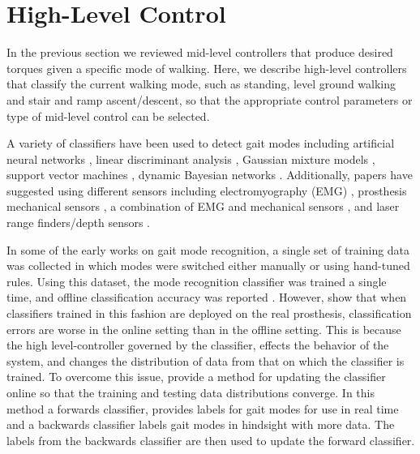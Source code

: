 \section{High-Level Control}\label{sec:back_high_level_control}

In the previous section we reviewed mid-level controllers that produce desired
torques given a specific mode of walking. Here, we describe high-level
controllers that classify the current walking mode, such as standing, level
ground walking and stair and ramp ascent/descent, so that the appropriate
control parameters or type of mid-level control can be selected. 

A variety of classifiers have been used to detect gait modes including
artificial neural networks \citep{huang2009strategy}, linear discriminant
analysis
\citep{huang2009strategy,huang2011continuous,hargrove2015intuitive,young2014intent},
Gaussian mixture models \citep{varol2010multiclass}, support vector machines
\citep{huang2011continuous,massalin2017user,yan2018locomotion}, dynamic Bayesian
networks \citep{young2014intent,hargrove2015intuitive,spanias2018online}.
Additionally, papers have suggested using different sensors including
electromyography (EMG) \citep{huang2009strategy}, prosthesis mechanical sensors
\citep{varol2010multiclass,young2014intent,young2014training}, a combination of
EMG and mechanical sensors
\citep{huang2011continuous,spanias2018online,hargrove2015intuitive}, and laser
range finders/depth sensors
\citep{zhang2011preliminary,liu2016development,massalin2017user,yan2018locomotion}.

In some of the early works on gait mode recognition, a single set of training
data was collected in which modes were switched either manually or using
hand-tuned rules. Using this dataset, the mode recognition classifier was
trained a single time, and offline classification accuracy was reported
\citep{huang2009strategy,huang2011continuous,young2014intent}. However,
\citet{hargrove2015intuitive} show that when classifiers trained in this fashion
are deployed on the real prosthesis, classification errors are worse in the
online setting than in the offline setting. This is because the high
level-controller governed by the classifier, effects the behavior of the system,
and changes the distribution of data from that on which the classifier is
trained. To overcome this issue, \citet{spanias2018online} provide a method for
updating the classifier online so that the training and testing data
distributions converge. In this method a forwards classifier, provides labels
for gait modes for use in real time and a backwards classifier labels gait modes
in hindsight with more data. The labels from the backwards classifier are then
used to update the forward classifier. 
